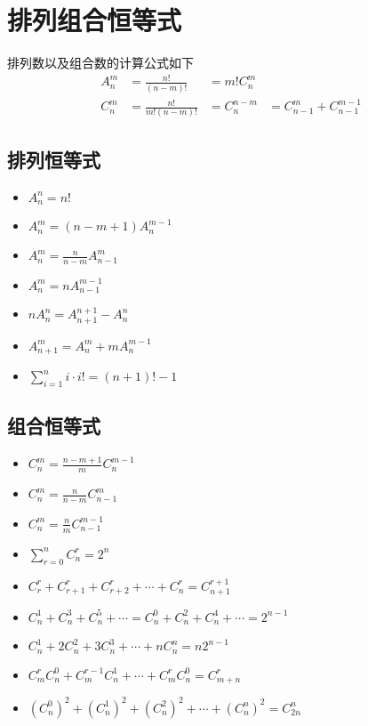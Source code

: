 \section{排列组合恒等式}

\begin{defination}
排列数以及组合数的计算公式如下
\[ \begin{aligned}
    A^m_n &= \frac{n!}{(n-m)!} &= m! C^m_n \\
    C^m_n &= \frac{n!}{m!(n-m)!} &= C^{n-m}_{n} &= C^m_{n-1} + C^{m-1}_{n-1}
\end{aligned} \]
\end{defination}

\subsection{排列恒等式}

\begin{itemize}
\item $A^n_n = n!$
\item $A^m_n = (n-m+1) A^{m-1}_n$
\item $A^{m}_{n} = \frac{n}{n-m} A^{m}_{n-1}$
\item $A^{m}_{n} = n A^{m-1}_{n-1}$
\item $nA^{n}_{n} = A^{n+1}_{n+1} - A^{n}_{n}$
\item $A^{m}_{n+1} = A^{m}_{n} + mA^{m-1}_{n}$
\item $\sum^n_{i=1} i \cdot i! = (n+1)! - 1$
\end{itemize}

\subsection{组合恒等式}

\begin{itemize}
\item $C^{m}_{n} = \frac{n-m+1}{m} C^{m-1}_{n}$
\item $C^{m}_{n} = \frac{n}{n-m} C^{m}_{n-1}$
\item $C^{m}_{n} = \frac{n}{m} C^{m-1}_{n-1}$
\item $\sum^n_{r=0} C^{r}_{n} = 2^n$
\item $C^{r}_{r} + C^{r}_{r+1} + C^{r}_{r+2} + \cdots + C^{r}_{n} = C^{r+1}_{n+1}$
\item $C^{1}_{n} + C^{3}_{n} + C^{5}_{n} + \cdots = C^{0}_{n} + C^{2}_{n} + C^{4}_{n} + \cdots = 2^{n-1}$
\item $C^{1}_{n} + 2C^{2}_{n} + 3C^{3}_{n} + \cdots + nC^{n}_{n} = n2^{n-1}$
\item $C^{r}_{m}C^{0}_{n} + C^{r-1}_{m}C^{1}_{n} + \cdots + C^{r}_{m}C^{0}_{n} = C^{r}_{m+n}$
\item $(C^{0}_{n})^2 + (C^{1}_{n})^2 + (C^{2}_{n})^2 + \cdots + (C^{n}_{n})^2 = C^{n}_{2n}$
\end{itemize}

